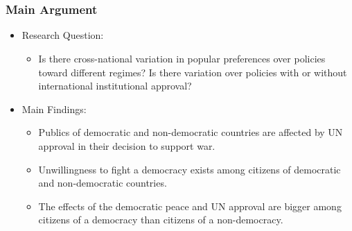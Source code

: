 \documentclass[table]{beamer}
\title[]{}
\author[]{Clara Suong}
\institute[]{New York University}
\date{~\\Prepared for \\the FOIArchive Advisory Board}
\begin{document}
\maketitle

\section{}
\begin{frame}
\frametitle{Main Argument}
\begin{itemize}
	\item Research Question:
    \begin{itemize}
    \item Is there cross-national variation in popular preferences over policies toward different regimes? Is there variation over policies with or without international institutional approval?
    \end{itemize}
    \item Main Findings:
        \begin{itemize}
       \item Publics of democratic and non-democratic countries are affected by UN approval in their decision to support war.
        \item Unwillingness to fight a democracy exists among citizens of democratic and non-democratic countries.
         \item The effects of the democratic peace and UN approval are bigger among citizens of a democracy than citizens of a non-democracy.
    	\end{itemize}
\end{itemize}
\end{frame}
\end{document}
